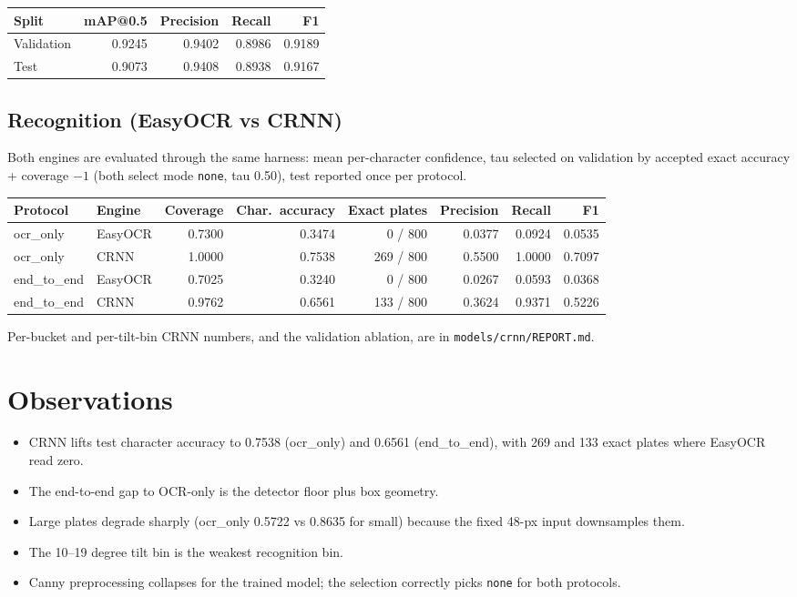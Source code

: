 \documentclass[11pt]{article}
\begin{document}
\begin{table}[h]
\centering
\begin{tabular}{@{}lrrrr@{}}
\toprule
Split & mAP@0.5 & Precision & Recall & F1 \\
\midrule
Validation & 0.9245 & 0.9402 & 0.8986 & 0.9189 \\
Test & 0.9073 & 0.9408 & 0.8938 & 0.9167 \\
\bottomrule
\end{tabular}
\end{table}

\subsection{Recognition (EasyOCR vs CRNN)}

Both engines are evaluated through the same harness: mean per-character
confidence, tau selected on validation by accepted exact accuracy + coverage
$-1$ (both select mode \texttt{none}, tau 0.50), test reported once per
protocol.

\begin{table}[h]
\centering
\begin{tabular}{@{}llrrrrrr@{}}
\toprule
Protocol & Engine & Coverage & Char.\ accuracy & Exact plates & Precision & Recall & F1 \\
\midrule
ocr\_only & EasyOCR & 0.7300 & 0.3474 & 0 / 800 & 0.0377 & 0.0924 & 0.0535 \\
ocr\_only & CRNN & 1.0000 & 0.7538 & 269 / 800 & 0.5500 & 1.0000 & 0.7097 \\
end\_to\_end & EasyOCR & 0.7025 & 0.3240 & 0 / 800 & 0.0267 & 0.0593 & 0.0368 \\
end\_to\_end & CRNN & 0.9762 & 0.6561 & 133 / 800 & 0.3624 & 0.9371 & 0.5226 \\
\bottomrule
\end{tabular}
\end{table}

Per-bucket and per-tilt-bin CRNN numbers, and the validation ablation, are in
\texttt{models/crnn/REPORT.md}.

\section{Observations}

\begin{itemize}
\item CRNN lifts test character accuracy to 0.7538 (ocr\_only) and 0.6561
  (end\_to\_end), with 269 and 133 exact plates where EasyOCR read zero.
\item The end-to-end gap to OCR-only is the detector floor plus box geometry.
\item Large plates degrade sharply (ocr\_only 0.5722 vs 0.8635 for small)
  because the fixed 48-px input downsamples them.
\item The 10--19 degree tilt bin is the weakest recognition bin.
\item Canny preprocessing collapses for the trained model; the selection
  correctly picks \texttt{none} for both protocols.
\end{itemize}
\end{document}
